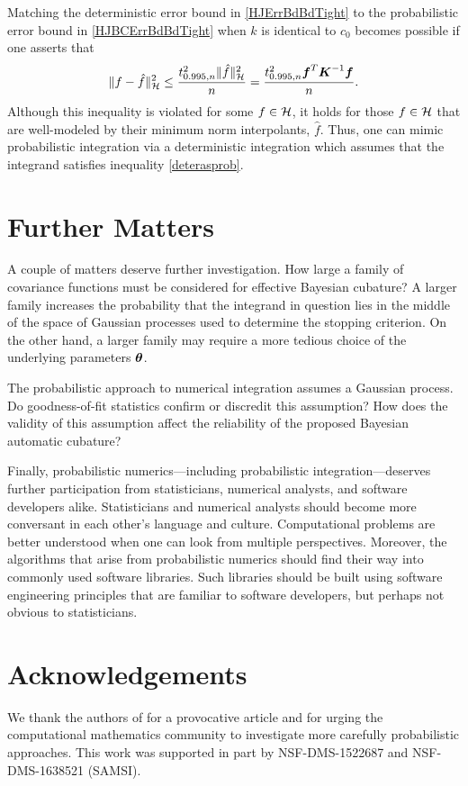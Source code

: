 \documentclass[sts]{imsart}
\numberwithin{equation}{section}
\theoremstyle{plain}
\newcommand{\calH}{\mathcal{H}}
\newcommand{\BOGOS}{\citetalias{BriEtal18a}}%
\begin{document}
Matching the deterministic error bound in \eqref{HJErrBdBdTight} to the probabilistic error bound in  \eqref{HJBCErrBdBdTight} when  $k$ is identical to $c_0$ becomes possible if one asserts that 
\begin{equation}
\label{deterasprob}
\lVert f - \hat{f} \rVert_{\calH}^2 \le \frac{ t_{0.995,n}^2 \lVert \hat{f} \rVert^2_{\calH}}{n} = \frac{t_{0.995,n}^2 \vf^T \vK^{-1} \vf}{n}.
\end{equation}
Although this inequality is violated for some $f \in \mathcal{H}$, it holds for those $f \in \mathcal{H}$ that are well-modeled by their minimum norm interpolants, $\hat{f}$.  Thus, one can mimic probabilistic integration via a deterministic integration which assumes that the integrand satisfies inequality \eqref{deterasprob}.


\section{Further Matters}

A couple of matters deserve further investigation.  How large a family of covariance functions must be considered for effective Bayesian cubature?  A larger family increases the probability that the integrand in question lies in the middle of the space of Gaussian processes used to determine the stopping criterion.  On the other hand, a larger family may require a more tedious choice of the underlying parameters $\boldsymbol{\theta}$.

The probabilistic approach to numerical integration assumes a Gaussian process.  Do goodness-of-fit statistics confirm or discredit this assumption?  How does the validity of this assumption affect the reliability of the proposed Bayesian automatic cubature?

Finally, probabilistic numerics---including probabilistic integration---deserves further participation from statisticians, numerical analysts, and software developers alike.  Statisticians and numerical analysts should become more conversant in each other's language and culture.  Computational problems are better understood when one can look from multiple perspectives.  Moreover, the algorithms that arise from probabilistic numerics should find their way into commonly used software libraries.  Such libraries should be built using  software engineering principles that are familiar to software developers, but perhaps not obvious to statisticians.




\section*{Acknowledgements}
We thank the authors of \BOGOS{} for a provocative article and for urging the computational mathematics community to investigate more carefully probabilistic approaches.  This work was supported in part by NSF-DMS-1522687 and NSF-DMS-1638521 (SAMSI).



\end{document}
